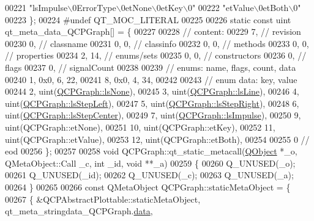 \begin{DoxyCode}
00221     \textcolor{stringliteral}{"lsImpulse\(\backslash\)0ErrorType\(\backslash\)0etNone\(\backslash\)0etKey\(\backslash\)0"}
00222     \textcolor{stringliteral}{"etValue\(\backslash\)0etBoth\(\backslash\)0"}
00223 \};
00224 \textcolor{preprocessor}{#undef QT\_MOC\_LITERAL}
00225 
00226 \textcolor{keyword}{static} \textcolor{keyword}{const} uint qt\_meta\_data\_QCPGraph[] = \{
00227 
00228  \textcolor{comment}{// content:}
00229        7,       \textcolor{comment}{// revision}
00230        0,       \textcolor{comment}{// classname}
00231        0,    0, \textcolor{comment}{// classinfo}
00232        0,    0, \textcolor{comment}{// methods}
00233        0,    0, \textcolor{comment}{// properties}
00234        2,   14, \textcolor{comment}{// enums/sets}
00235        0,    0, \textcolor{comment}{// constructors}
00236        0,       \textcolor{comment}{// flags}
00237        0,       \textcolor{comment}{// signalCount}
00238 
00239  \textcolor{comment}{// enums: name, flags, count, data}
00240        1, 0x0,    6,   22,
00241        8, 0x0,    4,   34,
00242 
00243  \textcolor{comment}{// enum data: key, value}
00244        2, uint(\hyperlink{a00031_ad60175cd9b5cac937c5ee685c32c0859aea9591b933733cc7b20786b71e60fa04}{QCPGraph::lsNone}),
00245        3, uint(\hyperlink{a00031_ad60175cd9b5cac937c5ee685c32c0859a3c42a27b15aa3c92d399082fad8b7515}{QCPGraph::lsLine}),
00246        4, uint(\hyperlink{a00031_ad60175cd9b5cac937c5ee685c32c0859ae10568bda57836487d9dec5eba1d6c6e}{QCPGraph::lsStepLeft}),
00247        5, uint(\hyperlink{a00031_ad60175cd9b5cac937c5ee685c32c0859a9c37951f7d11aa070100fd16f2935c9e}{QCPGraph::lsStepRight}),
00248        6, uint(\hyperlink{a00031_ad60175cd9b5cac937c5ee685c32c0859a5adf7b04da215a40a764c21294ea7366}{QCPGraph::lsStepCenter}),
00249        7, uint(\hyperlink{a00031_ad60175cd9b5cac937c5ee685c32c0859aa3b358b4ae7cca94aceeb8e529c12ebb}{QCPGraph::lsImpulse}),
00250        9, uint(QCPGraph::etNone),
00251       10, uint(QCPGraph::etKey),
00252       11, uint(QCPGraph::etValue),
00253       12, uint(QCPGraph::etBoth),
00254 
00255        0        \textcolor{comment}{// eod}
00256 \};
00257 
00258 \textcolor{keywordtype}{void} QCPGraph::qt\_static\_metacall(\hyperlink{a00059}{QObject} *\_o, QMetaObject::Call \_c, \textcolor{keywordtype}{int} \_id, \textcolor{keywordtype}{void} **\_a)
00259 \{
00260     Q\_UNUSED(\_o);
00261     Q\_UNUSED(\_id);
00262     Q\_UNUSED(\_c);
00263     Q\_UNUSED(\_a);
00264 \}
00265 
00266 \textcolor{keyword}{const} QMetaObject QCPGraph::staticMetaObject = \{
00267     \{ &QCPAbstractPlottable::staticMetaObject, qt\_meta\_stringdata\_QCPGraph.\hyperlink{a00067_a52173b02d8396dce2aa3a046123398ea}{data},

\end{DoxyCode}
